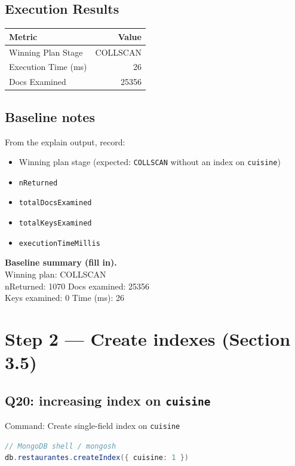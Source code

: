 \documentclass[11pt, letterpaper]{article}
\begin{document}
\subsection{Execution Results}
\begin{center}
\begin{tabular}{lr}
\toprule
\textbf{Metric} & \textbf{Value} \\
\midrule
Winning Plan Stage & COLLSCAN \\
Execution Time (ms) & 26 \\
Docs Examined & 25356 \\
\bottomrule
\end{tabular}
\end{center}

\subsection{Baseline notes}
From the explain output, record:
\begin{itemize}
  \item Winning plan stage (expected: \texttt{COLLSCAN} without an index on \texttt{cuisine})
  \item \texttt{nReturned}
  \item \texttt{totalDocsExamined}
  \item \texttt{totalKeysExamined}
  \item \texttt{executionTimeMillis}
\end{itemize}

\begin{tcolorbox}
\textbf{Baseline summary (fill in).}\\
Winning plan: COLLSCAN\\
nReturned: 1070 \quad
Docs examined: 25356\\
Keys examined: 0 \quad
Time (ms): 26
\end{tcolorbox}
\newpage

\section{Step 2 — Create indexes (Section 3.5)}
\subsection{Q20: increasing index on \texttt{cuisine}}

\begin{labstep}{Command: Create single-field index on \texttt{cuisine}}
\begin{lstlisting}[language=Java]
// MongoDB shell / mongosh
db.restaurantes.createIndex({ cuisine: 1 })
\end{lstlisting}
\end{labstep}
\end{document}
